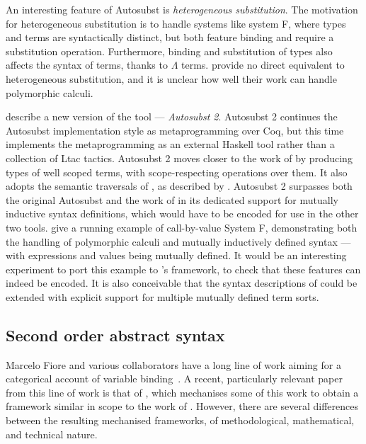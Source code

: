 An interesting feature of Autosubst is \emph{heterogeneous substitution}.
The motivation for heterogeneous substitution is to handle systems like system
F, where types and terms are syntactically distinct, but both feature binding
and require a substitution operation.
Furthermore, binding and substitution of types also affects the syntax of terms,
thanks to $\Lambda$ terms.
\citeauthor{AACMM21} provide no direct equivalent to heterogeneous substitution,
and it is unclear how well their work can handle polymorphic calculi.

 describe a new version of the tool --- \emph{Autosubst 2}.
Autosubst 2 continues the Autosubst implementation style as metaprogramming over
Coq, but this time implements the metaprogramming as an external Haskell tool
rather than a collection of Ltac tactics.
Autosubst 2 moves closer to the work of \citeauthor{AACMM21} by producing types
of well scoped terms, with scope-respecting operations over them.
It also adopts the semantic traversals of \citet{ACMM17}, as described by
\citet{Autosubst18}.
Autosubst 2 surpasses both the original Autosubst and the work of
\citet{AACMM21} in its dedicated support for mutually inductive syntax
definitions, which would have to be encoded for use in the other two tools.
 give a running example of call-by-value System F,
demonstrating both the handling of polymorphic calculi and mutually inductively
defined syntax --- with expressions and values being mutually defined.
It would be an interesting experiment to port this example to
\citeauthor{AACMM21}'s framework, to check that these features can indeed be
encoded.
It is also conceivable that the syntax descriptions of \citeauthor{AACMM21}
could be extended with explicit support for multiple mutually defined term
sorts.

\subsection{Second order abstract syntax}\label{sec:fiore}

Marcelo Fiore and various collaborators have a long line of work aiming for a
categorical account of variable binding~\citep{FPT99,Fiore08,FH13,FH10,FM10}.
A recent, particularly relevant paper from this line of work is that of
\citet{FS22}, which mechanises some of this work to obtain a framework similar
in scope to the work of \citet{AACMM21}.
However, there are several differences between the resulting mechanised
frameworks, of methodological, mathematical, and technical nature.

